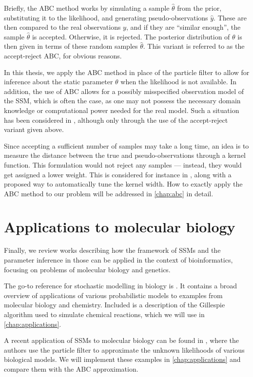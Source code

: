 Briefly, the ABC method works by simulating a sample $\hat{\theta}$ from the prior, substituting it to the likelihood, and generating pseudo-observations $\hat{y}$. These are then compared to the real observations $y$, and if they are ``similar enough'', the sample $\hat{\theta}$ is accepted. Otherwise, it is rejected. The posterior distribution of $\theta$ is then given in terms of these random samples $\hat{\theta}$. This variant is referred to as the accept-reject ABC, for obvious reasons.

In this thesis, we apply the ABC method in place of the particle filter to allow for inference about the static parameter $\theta$ when the likelihood is not available. In addition, the use of ABC allows for a possibly misspecified observation model of the SSM, which is often the case, as one may not possess the necessary domain knowledge or computational power needed for the real model. Such a situation has been considered in \cite{jasra-time-series}, although only through the use of the accept-reject variant given above.

Since accepting a sufficient number of samples may take a long time, an idea is to measure the distance between the true and pseudo-observations through a kernel function. This formulation would not reject any samples --- instead, they would get assigned a lower weight. This is considered for instance in \cite{dedecius}, along with a proposed way to automatically tune the kernel width. How to exactly apply the ABC method to our problem will be addressed in \autoref{chap:abc} in detail.

\section{Applications to molecular biology}
Finally, we review works describing how the framework of SSMs and the parameter inference in those can be applied in the context of bioinformatics, focusing on problems of molecular biology and genetics.

The go-to reference for stochastic modelling in biology is \cite{wilkinson-book}. It contains a broad overview of applications of various probabilistic models to examples from molecular biology and chemistry. Included is a description of the Gillespie algorithm \cite{gillespie1, gillespie2} used to simulate chemical reactions, which we will use in \autoref{chap:applications}.

A recent application of SSMs to molecular biology can be found in \cite{wilkinson}, where the authors use the particle filter to approximate the unknown likelihoods of various biological models. We will implement these examples in \autoref{chap:applications} and compare them with the ABC approximation.

